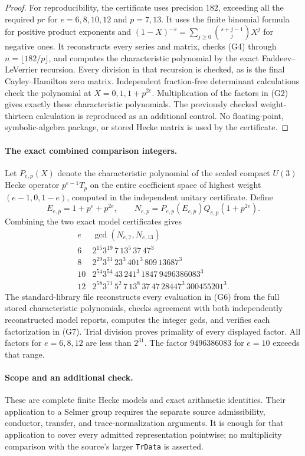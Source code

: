 \documentclass[11pt,a4paper]{article}
\theoremstyle{definition}
\begin{document}
\begin{proof}
For reproducibility, the certificate uses precision $182$, exceeding
all the required $pr$ for $e=6,8,10,12$ and $p=7,13$.
It uses the finite binomial formula for positive product exponents and
$(1-X)^{-s}=\sum_{j\ge0}\binom{s+j-1}{j}X^j$ for negative ones.
It reconstructs every series and matrix, checks (G4) through
$n=\lfloor182/p\rfloor$, and computes the characteristic polynomial by
the exact Faddeev--LeVerrier recursion. Every division in that recursion
is checked, as is the final Cayley--Hamilton zero matrix.
Independent fraction-free determinant calculations check the polynomial
at $X=0,1,1+p^{2e}$. Multiplication of the factors in (G2) gives exactly
these characteristic polynomials. The previously checked weight-thirteen
calculation is reproduced as an additional control. No floating-point,
symbolic-algebra package, or stored Hecke matrix is used by the certificate.
\end{proof}

\paragraph{The exact combined comparison integers.}
Let $P_{e,p}(X)$ denote the characteristic polynomial of the scaled
compact $U(3)$ Hecke operator $p^{e-1}T_p$ on the entire coefficient
space of highest weight $(e-1,0,1-e)$, computed in the independent
unitary certificate. Define
\[
 E_{e,p}=1+p^e+p^{2e},\qquad
 N_{e,p}=P_{e,p}(E_{e,p})Q_{e,p}(1+p^{2e}).
 \tag{G6}
\]
Combining the two exact model certificates gives
\[
\begin{array}{c|l}
e&\gcd(N_{e,7},N_{e,13})\\ \hline
6&2^{15}3^{19}\,7\,13^5\,37\,47^3\\
8&2^{29}3^{31}\,23^3\,401^3\,809\,13687^3\\
10&2^{54}3^{54}\,43\,241^3\,1847\,9496386083^3\\
12&2^{58}3^{71}\,5^2\,7\,13^8\,37\,47\,28447^3\,300455201^3.
\end{array}
\tag{G7}
\]
The standard-library file
 reconstructs every
evaluation in (G6) from the full stored characteristic polynomials,
checks agreement with both independently reconstructed model reports,
computes the integer gcds, and verifies each factorization in (G7).
Trial division proves primality of every displayed factor. All factors
for $e=6,8,12$ are less than $2^{31}$. The factor $9496386083$ for
$e=10$ exceeds that range.

\paragraph{Scope and an additional check.}
These are complete finite Hecke models and exact arithmetic identities.
Their application to a Selmer group requires the separate source
admissibility, conductor, transfer, and trace-normalization arguments.
It is enough for that application to cover every admitted representation
pointwise; no multiplicity comparison with the source's larger
\texttt{TrData} is asserted.
\end{document}
